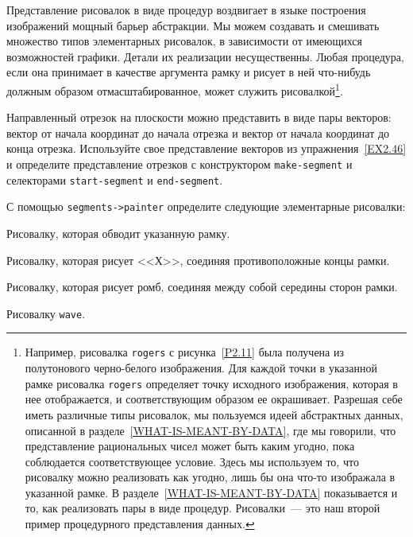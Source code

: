 Представление рисовалок в виде процедур воздвигает в
языке построения изображений мощный барьер абстракции.  Мы можем
создавать и смешивать множество типов элементарных рисовалок, в
зависимости от имеющихся возможностей графики.  Детали их
реализации несущественны.  Любая процедура, если она принимает в
качестве аргумента рамку и рисует в ней что-нибудь должным образом
отмасштабированное, может служить рисовалкой\footnote{Например, рисовалка {\tt rogers} с 
рисунка~\ref{P2.11} была получена из полутонового черно-белого
изображения. Для каждой точки в указанной рамке рисовалка
{\tt rogers} определяет точку исходного изображения, которая в
нее отображается, и соответствующим образом ее окрашивает.  Разрешая 
себе иметь различные типы рисовалок, мы пользуемся идеей абстрактных
данных, описанной в разделе~\ref{WHAT-IS-MEANT-BY-DATA},
где мы говорили, что представление рациональных чисел может быть каким 
угодно, пока соблюдается соответствующее условие.  Здесь мы используем 
то, что рисовалку можно реализовать как угодно, лишь бы она что-то
изображала в указанной рамке.  В разделе~\ref{WHAT-IS-MEANT-BY-DATA} показывается и то,
как реализовать пары в виде процедур.  Рисовалки~--- это наш второй
пример процедурного представления данных.
}.
\begin{exercise}{2.48}\label{EX2.48}%
Направленный отрезок на плоскости можно представить в виде пары векторов:  вектор от начала координат до начала отрезка и
вектор от начала координат до конца отрезка.  Используйте свое
представление векторов из упражнения~\ref{EX2.46} и
определите представление отрезков с конструктором
{\tt make-segment}
и селекторами {\tt start-segment}
и {\tt end-segment}.
\end{exercise}
\begin{exercise}{2.49}\label{EX2.49}%
С помощью {\tt segments->painter} определите
следующие элементарные рисовалки:

\begin{plainenum}
\item
Рисовалку, которая обводит указанную рамку.

\item
Рисовалку, которая рисует <<Х>>, соединяя
противоположные концы рамки.

\item
Рисовалку, которая рисует ромб, соединяя между
собой середины сторон рамки.

\item
Рисовалку {\tt wave}.
\end{plainenum}
\end{exercise}

